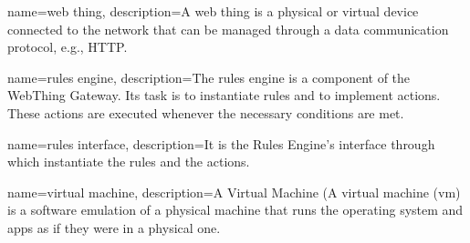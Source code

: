 


{
    name=web thing,
    description={A web thing is a physical or virtual device connected to the network that can be managed through a data communication protocol, e.g., HTTP.}
}

{
    name=rules engine,
    description={The rules engine is a component of the WebThing Gateway. Its task is to instantiate rules and to implement actions. These actions are executed whenever the necessary conditions are met.}
}

{
    name=rules interface,
    description={It is the Rules Engine's interface through which instantiate the rules and the actions.}
}


{
    name=virtual machine,
    description={A Virtual Machine (A virtual machine (\gls{vm}) is a software emulation of a physical machine that runs the operating system and apps as if they were in a physical one.}
}

